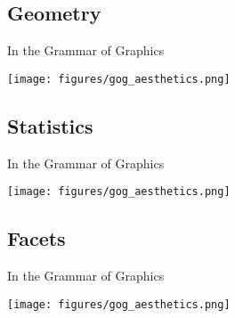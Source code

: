 \subsection*{Geometry}
\vspace{-2mm}
\begin{minipage}[t]{0.6\textwidth}
    In the Grammar of Graphics
    \hspace{1cm}
\end{minipage}%
\begin{minipage}[t]{0.4\textwidth}
    \vspace{-20pt}
    \texttt{[image: figures/gog\_aesthetics.png]}
\end{minipage}

\vspace{-2mm}

\subsection*{Statistics}
\vspace{-2mm}
\begin{minipage}[t]{0.6\textwidth}
    In the Grammar of Graphics
    \hspace{1cm}
\end{minipage}%
\begin{minipage}[t]{0.4\textwidth}
    \vspace{-20pt}
    \texttt{[image: figures/gog\_aesthetics.png]}
\end{minipage}

\vspace{-2mm}

\subsection*{Facets}
\vspace{-2mm}
\begin{minipage}[t]{0.6\textwidth}
    In the Grammar of Graphics
    \hspace{1cm}
\end{minipage}%
\begin{minipage}[t]{0.4\textwidth}
    \vspace{-20pt}
    \texttt{[image: figures/gog\_aesthetics.png]}
\end{minipage}

